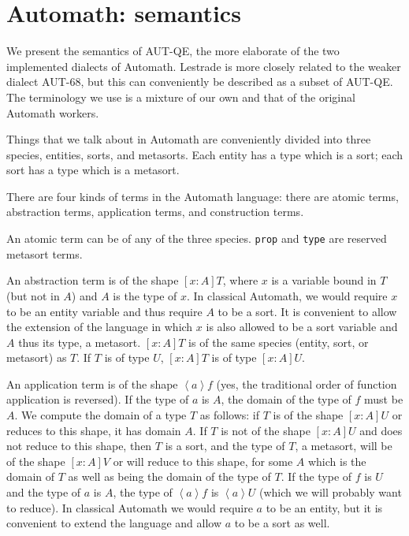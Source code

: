 \documentclass{article}
\begin{document}
\section{Automath:  semantics}

We present the semantics of AUT-QE, the more elaborate of the two implemented dialects of Automath.  Lestrade is more closely related to the weaker dialect AUT-68, but this can conveniently be described as a subset of AUT-QE.  The terminology we use is a mixture of our own and that of the original Automath workers.

Things that we talk about in Automath are conveniently divided into three species, entities, sorts, and metasorts.  Each entity has a type which is a sort;  each sort has a type which is a metasort.

There are four kinds of terms in the Automath language:  there are atomic terms, abstraction terms, application terms, and construction terms.

An atomic term can be of any of the three species.  {\tt prop} and {\tt type} are reserved metasort terms.

An abstraction term is of the shape $[x:A]T$, where $x$ is a variable bound in $T$ (but not in $A$) and $A$ is the type of $x$.  In classical Automath, we would require $x$ to be an entity variable and thus require $A$ to be a sort.  It is convenient to allow the extension of the language in which $x$ is also allowed to be a sort variable and $A$ thus its type, a metasort.  $[x:A]T$ is of the same species (entity, sort, or metasort) as $T$.  If $T$ is of type $U$,
$[x:A]T$ is of type $[x:A]U$.

An application term is of the shape $\left<a\right>f$ (yes, the traditional order of function application is reversed).  If the type of $a$ is $A$, the domain of the type of $f$ must be $A$.  We compute the domain
of a type $T$ as follows:  if $T$ is of the shape $[x:A]U$ or reduces to this shape, it has domain $A$.  If $T$ is not of the shape $[x:A]U$ and does not reduce to this shape, then $T$ is a sort, and the type of $T$, a metasort, will be of the shape $[x:A]V$ or will reduce to this shape, for some $A$ which is the domain of $T$ as well as being the domain of the type of $T$.  If the type of $f$ is $U$ and the type of $a$ is $A$, the type of $\left<a\right>f$ is $\left<a\right>U$ (which we will probably want to reduce).  In classical Automath we would require $a$ to be an entity, but it is convenient to extend the language and allow $a$ to be a sort as well.
\end{document}
